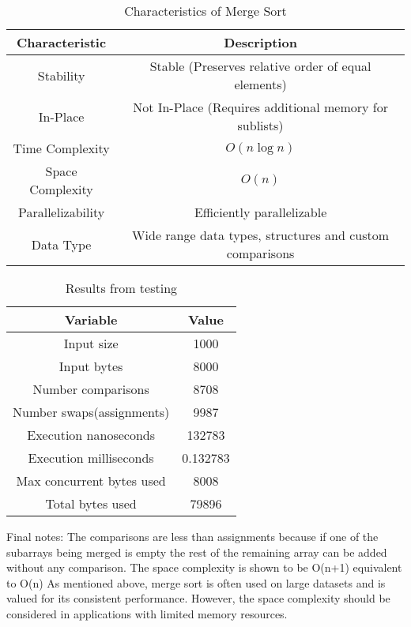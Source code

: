 \documentclass[12pt]{amsart}
\begin{document}
\begin{table}[ht]
    \centering
    \caption{Characteristics of Merge Sort}
    \begin{tabular}{|c|c|}
    \hline
    Characteristic & Description \\
    \hline
    Stability & Stable (Preserves relative order of equal elements) \\
    In-Place & Not In-Place (Requires additional memory for sublists) \\
    Time Complexity & $O(n \log n)$ \\
    Space Complexity & $O(n)$ \\
    Parallelizability & Efficiently parallelizable\\
    Data Type & Wide range data types, structures and custom comparisons\\
    \hline
    \end{tabular}
    \end{table}

\begin{table}[ht]
    \centering
    \caption{Results from testing}
    \begin{tabular}{|c|c|}
    \hline
    Variable & Value \\
    \hline
    Input size & 1000\\
    Input bytes & 8000\\
    Number comparisons & 8708\\
    Number swaps(assignments) & 9987\\
    Execution nanoseconds & 132783\\
    Execution milliseconds & 0.132783\\
    Max concurrent bytes used & 8008\\
    Total bytes used & 79896\\
    \hline
    \end{tabular}
    \end{table}

Final notes: The comparisons are less than assignments because if one of the subarrays being merged is empty the rest of the remaining array can be added without any comparison. The space complexity is shown to be O(n+1) equivalent to O(n)
As mentioned above, merge sort is often used on large datasets and is valued for its consistent performance. However, the space complexity should be considered in applications with limited memory resources.
\end{document}
